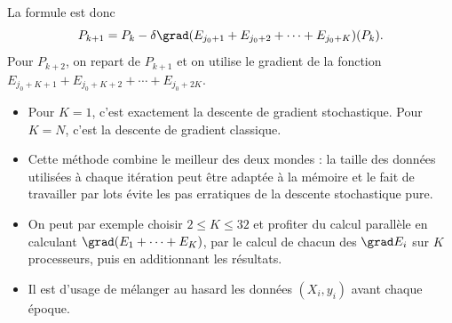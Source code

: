 \documentclass[10pt,class=report,crop=false]{standalone}
\begin{document}
La formule est donc
$$P_{k+1} = P_k - \delta \grad (E_{j_0+1}+E_{j_0+2}+\cdots+E_{j_0+K}) (P_k).$$
Pour $P_{k+2}$, on repart de $P_{k+1}$ et on utilise le gradient de la fonction $E_{j_0+K+1}+E_{j_0+K+2}+\cdots+E_{j_0+2K}$.


\begin{remarque*}
\sauteligne
\begin{itemize}
  \item Pour $K=1$, c'est exactement la descente de gradient stochastique. Pour $K=N$, c'est la descente de gradient classique.
  
  \item Cette méthode combine le meilleur des deux mondes : la taille des données utilisées à chaque itération peut être adaptée à la mémoire et le fait de travailler par lots évite les pas erratiques de la descente stochastique pure.
  
  \item On peut par exemple choisir $2 \le K \le 32$ et profiter du calcul parallèle en calculant $\grad (E_1+\cdots + E_K)$, par le calcul de chacun des $\grad E_i$ sur $K$ processeurs, puis en additionnant les résultats.
  
  \item Il est d'usage de mélanger au hasard les données $(X_i,y_i)$ avant chaque époque.
\end{itemize}
\end{remarque*}
\end{document}
